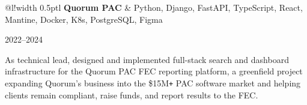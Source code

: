\documentclass[]{article}
\newcommand\VRule{\color{lightgray}\vrule width 0.5pt}
\def\Plus{\texttt{+}}
\begin{document}

\begin{tabular}{@{}l!{\VRule}l}
	{\bf Quorum PAC} & Python, Django, FastAPI, TypeScript, React, Mantine, Docker, K8s, PostgreSQL, Figma\\
\end{tabular}\hfill{\footnotesize 2022--2024}

As technical lead, designed and implemented full-stack search and dashboard infrastructure for the Quorum PAC FEC reporting platform, a greenfield project expanding Quorum's business into the \$15M{\Plus} PAC software market and helping clients remain compliant, raise funds, and report results to the FEC.\\


\end{document}
